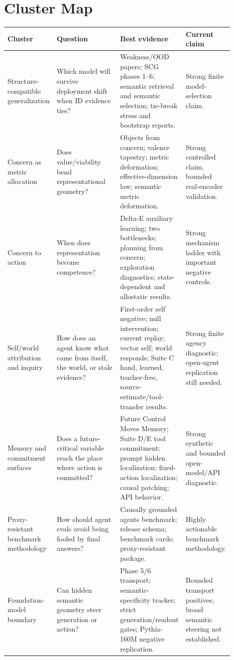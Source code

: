 \documentclass[11pt]{article}
\begin{document}
\section{Cluster Map}

\begin{longtable}{L{0.16\linewidth}L{0.29\linewidth}L{0.25\linewidth}L{0.20\linewidth}}
\toprule
\textbf{Cluster} & \textbf{Question} & \textbf{Best evidence} & \textbf{Current claim} \\
\midrule
\endhead
Structure-compatible generalization & Which model will survive deployment
shift when ID evidence ties? & Weakness/OOD papers; SCG phases 1--6; semantic
retrieval and semantic selection; tie-break stress and bootstrap reports. &
Strong finite model-selection claim. \\
\addlinespace
Concern as metric allocation & Does value/viability bend representational
geometry? & Objects from concern; valence tapestry; metric deformation;
effective-dimension law; semantic metric deformation. & Strong controlled
claim, bounded real-encoder validation. \\
\addlinespace
Concern to action & When does representation become competence? & Delta-E
auxiliary learning; two bottlenecks; planning from concern; exploration
diagnostics; state-dependent and allostatic results. & Strong mechanism ladder
with important negative controls. \\
\addlinespace
Self/world attribution and inquiry & How does an agent know what came from
itself, the world, or stale evidence? & First-order self negative; null
intervention; current replay; vector self; world responds; Suite C hand,
learned, teacher-free, source-estimate/tool-transfer results. & Strong finite
agency diagnostic; open-agent replication still needed. \\
\addlinespace
Memory and commitment surfaces & Does a future-critical variable reach the
place where action is committed? & Future Control Moves Memory; Suite D/E tool
commitment; prompt hidden localization; fixed-action localization; causal
patching; API behavior. & Strong synthetic and bounded open-model/API
diagnostic. \\
\addlinespace
Proxy-resistant benchmark methodology & How should agent evals avoid being
fooled by final answers? & Causally grounded agents benchmark; release schema;
benchmark cards; proxy-resistant package. & Highly actionable benchmark
methodology. \\
\addlinespace
Foundation-model boundary & Can hidden semantic geometry steer
generation or action? & Phase 5/6 transport; semantic-specificity tracker;
strict generation/readout gates; Pythia-160M negative replication. & Bounded
transport positives; broad semantic steering not established. \\
\bottomrule
\end{longtable}
\end{document}
